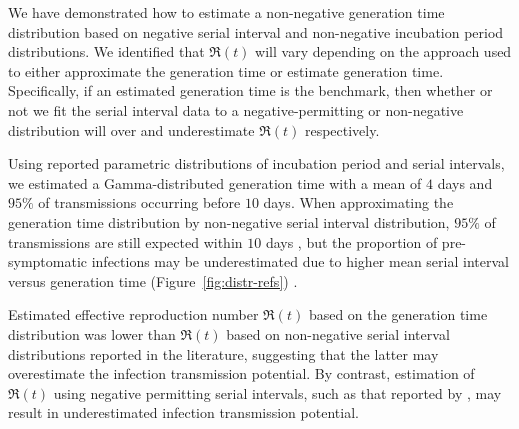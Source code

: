 
We have demonstrated how to estimate  %
a non-negative generation time distribution
based on negative serial interval
and non-negative incubation period distributions. %
We identified that $\Re(t)$ will vary depending on 
the approach used to either approximate the generation time 
or estimate generation time. Specifically, if an
estimated generation time is the benchmark, then
whether or not we fit the serial interval data to 
a negative-permitting or non-negative distribution will
over and underestimate $\Re(t)$ respectively.  %

\par %
Using reported parametric \covid distributions of incubation period and serial intervals,
we estimated a Gamma-distributed generation time
with a mean of $4$ days and                                     %
$95\%$ of transmissions occurring before $10$ days. %
When approximating the generation time distribution   %
by non-negative serial interval distribution,
$95\%$ of transmissions are still expected within $10$ days
\cite{Zhang2020,Nishiura2020},
but the proportion of pre-symptomatic infections may be underestimated  %
due to higher mean serial interval versus generation time
(Figure~\ref{fig:distr-refs}) \cite{Ganyani2020,Tindale2020}.

\par %
Estimated effective reproduction number $\Re(t)$
based on the generation time distribution
was lower than $\Re(t)$ based on
non-negative serial interval distributions reported in the literature,  %
suggesting that the latter may overestimate
the infection transmission potential.
By contrast, estimation of $\Re(t)$ using
negative permitting serial intervals,
such as that reported by \textcite{Du2020},
may result in underestimated infection transmission potential.

